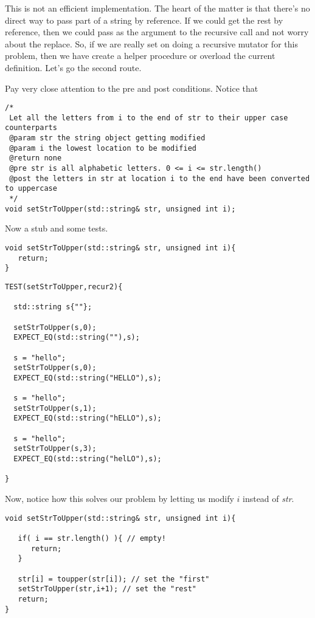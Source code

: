 \documentclass[]{tufte-handout}
\begin{document}
This is not an efficient implementation. The heart of the matter is that there's no direct way to pass part of a string by reference.  If we could get the rest by reference, then we could pass as the argument to the recursive call and not worry about the replace.  So, if we are really set on doing a recursive mutator for this problem, then we have create a helper procedure or overload the current definition. Let's go the second route.

Pay very close attention to the pre and post conditions. Notice that 
\begin{verbatim}
/*
 Let all the letters from i to the end of str to their upper case counterparts
 @param str the string object getting modified
 @param i the lowest location to be modified
 @return none
 @pre str is all alphabetic letters. 0 <= i <= str.length()
 @post the letters in str at location i to the end have been converted to uppercase
 */
void setStrToUpper(std::string& str, unsigned int i);
\end{verbatim}

Now a stub and some tests.
\begin{verbatim}
void setStrToUpper(std::string& str, unsigned int i){
   return;
}
\end{verbatim}

\begin{verbatim}
TEST(setStrToUpper,recur2){

  std::string s{""};
  
  setStrToUpper(s,0);
  EXPECT_EQ(std::string(""),s);
  
  s = "hello";
  setStrToUpper(s,0);
  EXPECT_EQ(std::string("HELLO"),s);  
  
  s = "hello";
  setStrToUpper(s,1);
  EXPECT_EQ(std::string("hELLO"),s);  
  
  s = "hello";
  setStrToUpper(s,3);
  EXPECT_EQ(std::string("helLO"),s);  

}
\end{verbatim}

Now, notice how this solves our problem by letting us modify $i$ instead of \textit{str}.
\begin{verbatim}
void setStrToUpper(std::string& str, unsigned int i){
   
   if( i == str.length() ){ // empty!
      return;
   }
   
   str[i] = toupper(str[i]); // set the "first"
   setStrToUpper(str,i+1); // set the "rest"
   return;
}
\end{verbatim}
\end{document}
